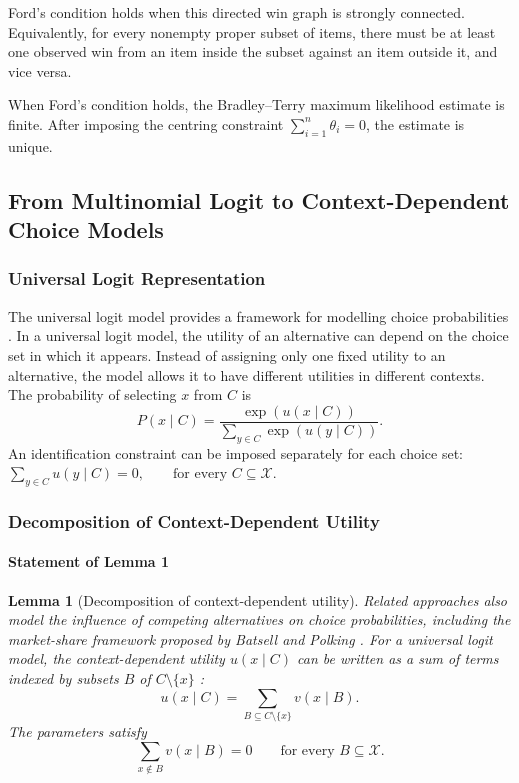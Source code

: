 \documentclass[11pt,a4paper]{article}
\newcommand{\X}{\mathcal{X}}
\newtheorem{lemma}[definition]{Lemma}
\begin{document}
Ford's condition holds when this directed win graph is strongly
connected. Equivalently, for every nonempty proper subset of items,
there must be at least one observed win from an item inside the subset
against an item outside it, and vice versa.

When Ford's condition holds, the Bradley--Terry maximum likelihood
estimate is finite. After imposing the centring constraint
$\sum_{i=1}^{n}\theta_i=0$,
the estimate is unique.


\subsection[Context-dependent models]{From Multinomial Logit to Context-Dependent Choice Models}
\subsubsection[Universal logit]{Universal Logit Representation}
The universal logit model provides a framework for modelling
choice probabilities \citep{mcfadden1975}.
In a universal logit model, the utility of an alternative can depend on the
choice set in which it appears. Instead of assigning only one fixed utility to
an alternative, the model allows it to have different utilities in different
contexts.
The probability of selecting $x$ from $C$ is
\begin{equation}
    P(x\mid C)
    =
    \frac{\exp(u(x\mid C))}
    {\displaystyle\sum_{y\in C}\exp(u(y\mid C))}.
    \label{eq:context-logit}
\end{equation}
An identification constraint can be imposed separately for each choice set:
\(\sum_{y\in C}u(y\mid C)=0, \qquad \text{for every } C\subseteq\X.\)
\subsubsection[Utility decomposition]{Decomposition of Context-Dependent Utility}
\paragraph{Statement of Lemma 1}
\begin{lemma}[Decomposition of context-dependent utility]Related approaches also model the influence of competing
alternatives on choice probabilities, including the
market-share framework proposed by Batsell and Polking
\citep{batsell1985}.
For a universal logit model, the context-dependent utility $u(x\mid C)$ can
be written as a sum of terms indexed by subsets $B$ of
$C\setminus\{x\}$ \citep{seshadri2019}:
\begin{equation}
    u(x\mid C)
    =
    \sum_{B\subseteq C\setminus\{x\}}v(x\mid B).
    \label{eq:utility-decomposition}
\end{equation}
The parameters satisfy
\begin{equation}
    \sum_{x\notin B}v(x\mid B)=0
    \qquad
    \text{for every } B\subseteq\X.
    \label{eq:decomposition-constraint}
\end{equation}
\end{lemma}
\end{document}
